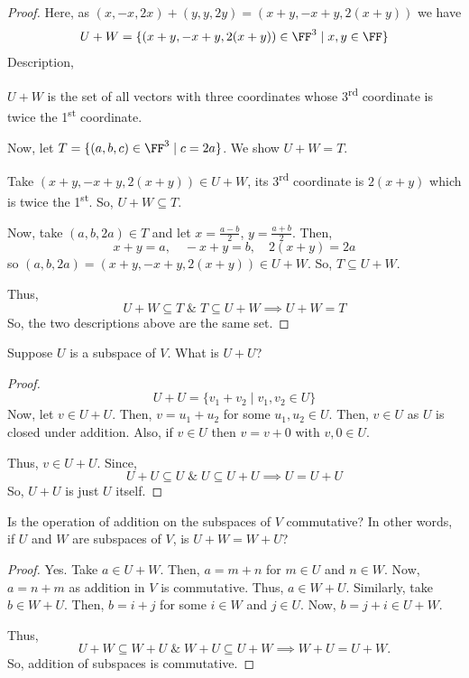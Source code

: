 \begin{proof}
Here, as $(x,-x,2x) + (y,y,2y) = (x+y, -x+y, 2(x+y))$ we have
\[
U + W = \{(x+y, -x+y, 2(x+y)) \in \FF^3 \mid x, y \in \FF\}
\]
Description,

$U + W$ is the set of all vectors with three coordinates whose 3\textsuperscript{rd} coordinate is twice the 1\textsuperscript{st} coordinate.

Now, let $T = \{(a,b,c) \in \FF^3 \mid c = 2a\}$. We show $U + W = T$.

Take $(x+y, -x+y, 2(x+y)) \in U + W$, its 3\textsuperscript{rd} coordinate is $2(x+y)$ which is twice the 1\textsuperscript{st}. So, $U + W \subseteq T$.

Now, take $(a,b,2a) \in T$ and let $x = \frac{a-b}{2}$, $y = \frac{a+b}{2}$. Then,
\[
x + y = a, \quad -x + y = b, \quad 2(x+y) = 2a
\]
so $(a,b,2a) = (x+y, -x+y, 2(x+y)) \in U + W$. So, $T \subseteq U + W$.

Thus,
\[
U + W \subseteq T \;\&\; T \subseteq U + W \implies U + W = T
\]
So, the two descriptions above are the same set.
\end{proof}

\begin{exercise}
Suppose $U$ is a subspace of $V$. What is $U + U$?
\end{exercise}

\begin{proof}
\[
U + U = \{v_1 + v_2 \mid v_1, v_2 \in U\}
\]
Now, let $v \in U + U$. Then, $v = u_1 + u_2$ for some $u_1, u_2 \in U$. Then, $v \in U$ as $U$ is closed under addition. Also, if $v \in U$ then $v = v + 0$ with $v, 0 \in U$.

Thus, $v \in U + U$. Since,
\[
U + U \subseteq U \;\&\; U \subseteq U + U \implies U = U + U
\]
So, $U + U$ is just $U$ itself.
\end{proof}

\begin{exercise}
    \label{ex:1.15}
Is the operation of addition on the subspaces of $V$ commutative? In other words, if $U$ and $W$ are subspaces of $V$, is $U + W = W + U$?
\end{exercise}

\begin{proof}
Yes. Take $a \in U + W$. Then, $a = m + n$ for $m \in U$ and $n \in W$. Now, $a = n + m$ as addition in $V$ is commutative. Thus, $a \in W + U$. Similarly, take $b \in W + U$. Then, $b = i + j$ for some $i \in W$ and $j \in U$. Now, $b = j + i \in U + W$.

Thus,
\[
U + W \subseteq W + U \;\&\; W + U \subseteq U + W \implies W + U = U + W.
\]
So, addition of subspaces is commutative.
\end{proof}

